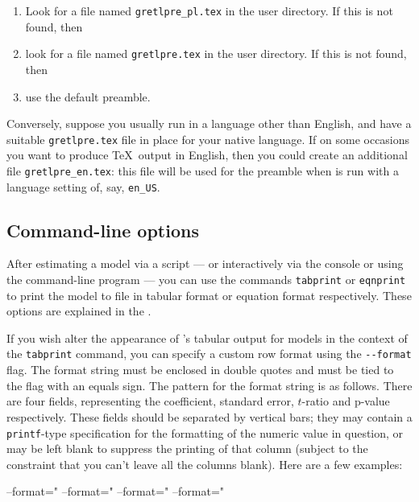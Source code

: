 \begin{enumerate}
\item Look for a file named \verb|gretlpre_pl.tex| in the 
  user directory.  If this is not found, then
\item look for a file named \verb|gretlpre.tex| in the 
  user directory.  If this is not found, then
\item use the default preamble.
\end{enumerate}

Conversely, suppose you usually run  in a language other
than English, and have a suitable \verb|gretlpre.tex| file in place
for your native language.  If on some occasions you want to produce
\TeX\ output in English, then you could create an additional
file \verb|gretlpre_en.tex|: this file will be used for the preamble
when  is run with a language setting of, say,
\verb|en_US|.  


\subsection{Command-line options}

After estimating a model via a script --- or interactively via the
 console or using the command-line program 
--- you can use the commands \texttt{tabprint} or \texttt{eqnprint} to
print the model to file in tabular format or equation format
respectively.  These options are explained in the \GCR{}.  

If you wish alter the appearance of 's tabular output for
models in the context of the \texttt{tabprint} command, you can
specify a custom row format using the \verb|--format| flag.  The
format string must be enclosed in double quotes and must be tied to
the flag with an equals sign.  The pattern for the format string is as
follows.  There are four fields, representing the coefficient,
standard error, $t$-ratio and p-value respectively.  These fields
should be separated by vertical bars; they may contain a
\texttt{printf}-type specification for the formatting of the numeric
value in question, or may be left blank to suppress the printing of
that column (subject to the constraint that you can't leave all the
columns blank).  Here are a few examples:

\begin{code}
--format="%
--format="%
--format="%
--format="%
\end{code}

